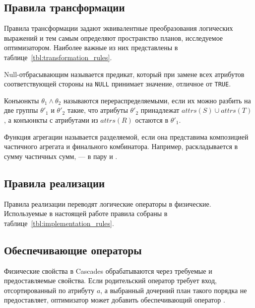 \documentclass[fontsize=14pt, russian]{scrartcl}
\begin{document}
\subsection{Правила трансформации}

Правила трансформации задают эквивалентные преобразования логических выражений и
тем самым определяют пространство планов, исследуемое оптимизатором. Наиболее
важные из них представлены в таблице~\ref{tbl:transformation_rules}.

\begin{Definition}
Null-отбрасывающим называется предикат, который при замене всех атрибутов
соответствующей стороны на \texttt{NULL} принимает значение, отличное от
\texttt{TRUE}.
\end{Definition}

\begin{Definition}
Конъюнкты \(\theta_1 \land \theta_2\) называются перераспределяемыми, если их
можно разбить на две группы \(\theta'_1\) и \(\theta'_2\) такие, что атрибуты
\(\theta'_2\) принадлежат \(attrs(S) \cup attrs(T)\), а конъюнкты с атрибутами
из \(attrs(R)\) остаются в \(\theta'_1\).
\end{Definition}

\begin{Definition}
Функция агрегации называется разделяемой, если она представима композицией
частичного агрегата и финального комбинатора. Например, \SUM{} раскладывается в
сумму частичных сумм, \AVG{} --- в пару \SUM{} и \COUNT{}.
\end{Definition}

\subsection{Правила реализации}

Правила реализации переводят логические операторы в физические. Используемые в
настоящей работе правила собраны в таблице~\ref{tbl:implementation_rules}.

\subsection{Обеспечивающие операторы}

Физические свойства в Cascades обрабатываются через требуемые и предоставляемые
свойства. Если родительский оператор требует вход, отсортированный по атрибуту
\(a\), а выбранный дочерний план такого порядка не предоставляет, оптимизатор
может добавить обеспечивающий оператор \Sort.
\end{document}

